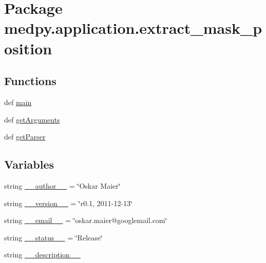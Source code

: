\hypertarget{namespacemedpy_1_1application_1_1extract__mask__position}{
\section{Package medpy.application.extract\_\-mask\_\-position}
\label{namespacemedpy_1_1application_1_1extract__mask__position}
}
\subsection*{Functions}
\begin{DoxyCompactItemize}
\item 
def \hyperlink{namespacemedpy_1_1application_1_1extract__mask__position_a91d051dd0f4b95de269c370f4a52b73a}{main}
\item 
def \hyperlink{namespacemedpy_1_1application_1_1extract__mask__position_aabaa031fd7182cd53068e2556bc0d0e6}{getArguments}
\item 
def \hyperlink{namespacemedpy_1_1application_1_1extract__mask__position_a4f52d0f7715761cedf08e65ef782ec46}{getParser}
\end{DoxyCompactItemize}
\subsection*{Variables}
\begin{DoxyCompactItemize}
\item 
string \hyperlink{namespacemedpy_1_1application_1_1extract__mask__position_af699933eba341cf2fad62194997dded2}{\_\-\_\-author\_\-\_\-} = \char`\"{}Oskar Maier\char`\"{}
\item 
string \hyperlink{namespacemedpy_1_1application_1_1extract__mask__position_a6438d861bc2f95505e058add33e655da}{\_\-\_\-version\_\-\_\-} = \char`\"{}r0.1, 2011-\/12-\/13\char`\"{}
\item 
string \hyperlink{namespacemedpy_1_1application_1_1extract__mask__position_a988104fed2bdcdf91654440be293a898}{\_\-\_\-email\_\-\_\-} = \char`\"{}oskar.maier@googlemail.com\char`\"{}
\item 
string \hyperlink{namespacemedpy_1_1application_1_1extract__mask__position_a25001c0b8b158a353365ad9b3728b17b}{\_\-\_\-status\_\-\_\-} = \char`\"{}Release\char`\"{}
\item 
string \hyperlink{namespacemedpy_1_1application_1_1extract__mask__position_a7a396ee1f669442ace08a8650397af21}{\_\-\_\-description\_\-\_\-}
\end{DoxyCompactItemize}


